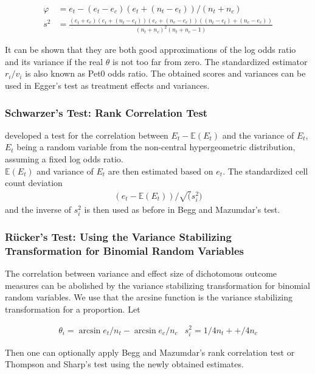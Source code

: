 \begin{align}
\varphi &= e_t - (e_t - e_c)(e_t + (n_t - e_t))/(n_t + n_c) \label{harbord.score} \\
s^2 &= \frac{(e_t + e_c)(e_t + (n_t - e_t))(e_c + (n_c - e_c))((n_t - e_t) + (n_c - e_c))}{(n_t + n_c)^2(n_t + n_c - 1)} \label{harbord.variance}
\end{align}

It can be shown that they are both good approximations of the log odds ratio and its variance if the real $\theta$ is not too far from zero. The standardized estimator $r_i/v_i$ is also known as Pet0 odds ratio. The obtained scores and variances can be used in Egger's test as treatment effects and variances.


\subsubsection{Schwarzer's Test: Rank Correlation Test} \label{sec:Schwarzer}
\citet{Schwarzer} developed a test for the correlation between $E_t - \mathbb{E}(E_t)$ and the variance of $E_t$, $E_t$ being a random variable from the non-central hypergeometric distribution, assuming a fixed log odds ratio. \\
$\mathbb{E}(E_t)$ and variance of $E_t$ are then estimated based on $e_t$. The standardized cell count deviation 
\begin{align}
(e_t - \mathbb{E}(E_t))/\sqrt(s_i^2)
\end{align}
and the inverse of $s_i^2$ is then used as before in Begg and Mazumdar's test.

\subsubsection{R\"ucker's Test: Using the Variance Stabilizing Transformation for Binomial Random Variables} \label{sec:Rucker}
The correlation between variance and effect size of dichotomous outcome measures can be abolished by the variance stabilizing transformation for binomial random variables. We use that the arcsine function is the variance stabilizing transformation for a proportion. Let

\begin{align}
\theta_i = \arcsin{e_t/n_t} - \arcsin{e_c/n_c} \nonumber &
s_i^2 = 1/4n_t + +/4n_c \nonumber
\end{align}

Then one can optionally apply Begg and Mazumdar's rank correlation test or Thompson and Sharp's test using the newly obtained estimates.


